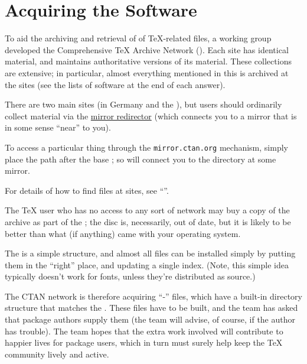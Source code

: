
\section{Acquiring the Software}


To aid the archiving and retrieval of of \TeX{}-related files, a
 working group developed the Comprehensive \TeX{} Archive
Network ().  Each  site has identical material,
and maintains authoritative versions of its material.  These
collections are extensive; in particular, almost everything mentioned
in this 
is archived at the  sites (see the lists of software at the
end of each answer).

There are two main  sites (in Germany and the ),
but users should ordinarily collect material via the %
\href{http://mirror.ctan.org/}{ mirror redirector}
(which connects you to a mirror that is in some sense ``near'' to
you).

To access a particular thing through the \texttt{mirror.ctan.org}
mechanism, simply place the  path after the base
; so
 will
connect you to the  directory at some 
mirror.

For details of how to find files at  sites, see
``''.

The \TeX{} user who has no access to any sort of
network may buy a copy of the archive as part of the
; the disc is, necessarily, out
of date, but it is likely to be better than what (if anything) came
with your operating system.


The  is a simple structure, and almost all
files can be installed simply by putting them in the ``right'' place,
and updating a single index.  (Note, this simple idea typically
doesn't work for fonts, unless they're distributed as \MF{} source.)

The CTAN network is therefore acquiring ``-'' files,
which have a built-in directory structure that matches the .
These files have to be built, and the  team has asked that
package authors supply them (the team will advise, of course, if the
author has trouble).  The  team hopes that the extra work
involved will contribute to happier lives for package users, which in
turn must surely help keep the TeX community lively and active.

